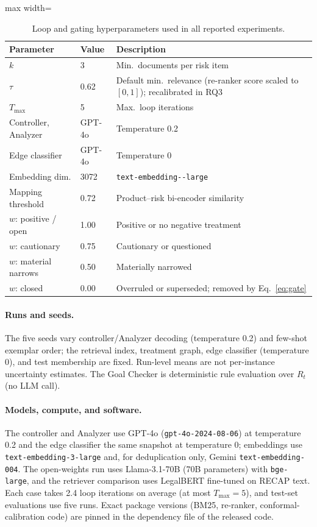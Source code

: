\begin{table}[h]
\centering
\small
\setlength{\tabcolsep}{3pt}
\begin{adjustbox}{max width=\columnwidth}
\begin{tabular}{llp{2.8cm}}
\toprule
Parameter & Value & Description \\
\midrule
$k$ & 3 & Min.\ documents per risk item \\
$\tau$ & 0.62 & Default min.\ relevance (re-ranker score scaled to $[0, 1]$); recalibrated in RQ3 \\
$T_{\max}$ & 5 & Max.\ loop iterations \\
Controller, Analyzer & GPT-4o & Temperature 0.2 \\
Edge classifier & GPT-4o & Temperature 0 \\
Embedding dim. & 3072 & \texttt{text-\allowbreak embedding-\allowbreak 3-\allowbreak large} \\
Mapping threshold & 0.72 & Product--risk bi-encoder similarity \\
$w$: positive / open & 1.00 & Positive or no negative treatment \\
$w$: cautionary & 0.75 & Cautionary or questioned \\
$w$: material narrows & 0.50 & Materially narrowed \\
$w$: closed & 0.00 & Overruled or superseded; removed by Eq.~\eqref{eq:gate} \\
\bottomrule
\end{tabular}
\end{adjustbox}
\caption{Loop and gating hyperparameters used in all reported experiments.}
\label{tab:hyperparams}
\end{table}

\paragraph{Runs and seeds.}
The five seeds vary controller/Analyzer decoding (temperature 0.2) and few-shot exemplar order; the retrieval index, treatment graph, edge classifier (temperature 0), and test membership are fixed.
Run-level means are not per-instance uncertainty estimates.
The Goal Checker is deterministic rule evaluation over $R_t$ (no LLM call).

\paragraph{Models, compute, and software.}
The controller and Analyzer use GPT-4o (\texttt{gpt-4o-2024-08-06}) at temperature 0.2 and the edge classifier the same snapshot at temperature 0; embeddings use \texttt{text-embedding-3-large} and, for deduplication only, Gemini \texttt{text-embedding-004}.
The open-weights run uses Llama-3.1-70B (70B parameters) with \texttt{bge-large}, and the retriever comparison uses LegalBERT fine-tuned on RECAP text.
Each case takes 2.4 loop iterations on average (at most $T_{\max} = 5$), and test-set evaluations use five runs.
Exact package versions (BM25, re-ranker, conformal-calibration code) are pinned in the dependency file of the released code.

